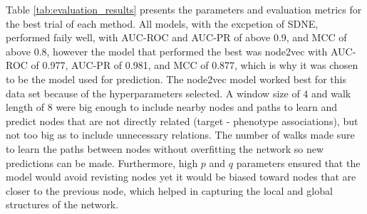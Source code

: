 Table \ref{tab:evaluation_results} presents the parameters and evaluation metrics for the best trial of each method.
All models, with the excpetion of \ac{SDNE}, performed faily well, with AUC-ROC and AUC-PR of above 0.9, and MCC of above 0.8, however the model that performed the best was node2vec with AUC-ROC of 0.977, AUC-PR of 0.981, and \ac{MCC} of 0.877, which is why it was chosen to be the model used for prediction.
The node2vec model worked best for this data set because of the hyperparameters selected.
A window size of 4 and walk length of 8 were big enough to include nearby nodes and paths to learn and predict nodes that are not directly related (target - phenotype associations), but not too big as to include unnecessary relations.
The number of walks made sure to learn the paths between nodes without overfitting the network so new predictions can be made.
Furthermore, high $p$ and $q$ parameters ensured that the model would avoid revisting nodes yet it would be biased toward nodes that are closer to the previous node, which helped in capturing the local and global structures of the network.

